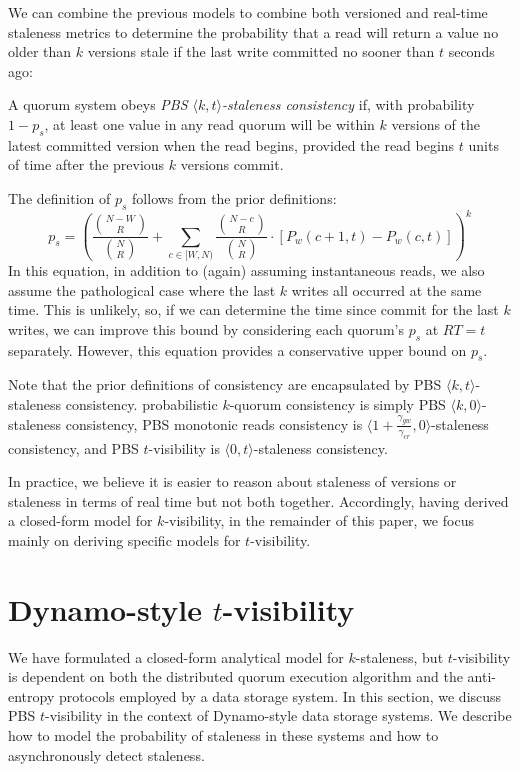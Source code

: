 \documentclass{vldb}
\newcommand{\sectionskip}{-0em}
\begin{document}
We can combine the previous models to combine both versioned and
real-time staleness metrics to determine the probability that a read
will return a value no older than $k$ versions stale if the last write
committed no sooner than $t$ seconds ago:
\begin{definition}
A quorum system obeys \textit{PBS $\langle k, t \rangle$-staleness
  consistency} if, with probability $1-p_{s}$, at least one value in
any read quorum will be within $k$ versions of the latest committed
version when the read begins, provided the read begins $t$ units of
time after the previous $k$ versions commit.
\end{definition}
The definition of $p_{s}$ follows from the prior definitions:
\begin{equation}
p_{s} = \left(\frac{{N-W \choose R}}{{N \choose R}}+\sum_{c\in[W, N)} \frac{{N-c \choose R}}{{N \choose R}} \cdot [P_w(c+1, t)-P_w(c,t)]\right)^k
\end{equation}
In this equation, in addition to (again) assuming instantaneous reads,
we also assume the pathological case where the last $k$ writes all
occurred at the same time.  This is unlikely, so, if we can determine
the time since commit for the last $k$ writes, we can improve this
bound by considering each quorum's $p_{s}$ at $RT=t$ separately.
However, this equation provides a conservative upper bound on $p_{s}$.

Note that the prior definitions of consistency are encapsulated by PBS
$\langle k, t \rangle$-staleness consistency. probabilistic $k$-quorum
consistency is simply PBS $\langle k, 0 \rangle$-staleness consistency,
PBS monotonic reads consistency is $\langle
1+\frac{\gamma_{gw}}{\gamma_{cr}}, 0 \rangle$-staleness consistency, and
PBS $t$-visibility is $\langle 0, t \rangle$-staleness consistency.

In practice, we believe it is easier to reason about staleness of
versions or staleness in terms of real time but not both together.
Accordingly, having derived a closed-form model for $k$-visibility, in
the remainder of this paper, we focus mainly on deriving specific models
for $t$-visibility.

\vspace{\sectionskip}\section{Dynamo-style $t$-visibility}
\label{sec:dynamo}

We have formulated a closed-form analytical model for $k$-staleness,
but $t$-visibility is dependent on both the distributed quorum
execution algorithm and the anti-entropy protocols employed by a data
storage system.  In this section, we discuss PBS $t$-visibility in the
context of Dynamo-style data storage systems.  We describe how to
model the probability of staleness in these systems and how to
asynchronously detect staleness.
\end{document}
